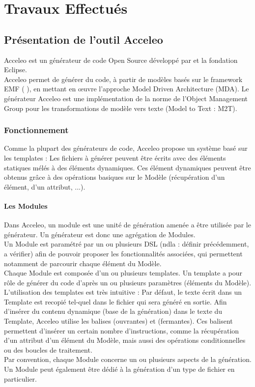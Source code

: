 \chapter{Travaux Effectués}\label{chap:tra}

\section{Présentation de l'outil Acceleo}

Acceleo est un générateur de code Open Source développé par \kwobeo{} et la fondation Eclipse.
\\
Acceleo permet de générer du code, à partir de modèles basés sur le framework EMF (\cf{} \cite{emf}), en mettant en œuvre l'approche Model Driven Architecture (MDA). Le générateur Acceleo est une implémentation de la norme de l'Object Management Group \cite{omg} pour les transformations de modèle vers texte (Model to Text : M2T).

\subsection{Fonctionnement}

Comme la plupart des générateurs de code, Acceleo propose un système basé sur les templates : Les fichiers à générer peuvent être écrits avec des éléments statiques mélés à des éléments dynamiques. Ces élément dynamiques peuvent être obtenus grâce à des opérations basiques sur le Modèle (récupération d'un élément, d'un attribut, ...).

\subsubsection{Les Modules}

Dans Acceleo, un module est une unité de génération amenée a être utilisée par le générateur. Un générateur est donc une agrégation de Modules.
\\
Un Module est paramétré par un ou plusieurs DSL (ndla : définir précédemment, a vérifier) afin de pouvoir proposer les fonctionnalités associées, qui permettent notamment de parcourir chaque élément du Modèle.
\\
Chaque Module est composée d'un ou plusieurs templates. Un template a pour rôle de générer du code d'après un ou plusieurs paramètres (éléments du Modèle). L'utilisation des templates est très intuitive : Par défaut, le texte écrit dans un Template est recopié tel-quel dans le fichier qui sera généré en sortie. Afin d'insérer du contenu dynamique (base de la génération) dans le texte du Template, Acceleo utilise les balises \guim{\textbf{[}} (ouvrantes) et \guim{\textbf{/]}} (fermantes). Ces balisent permettent d'insérer un certain nombre d'instructions, comme la récupération d'un attribut d'un élément du Modèle, mais aussi des opérations conditionnelles ou des boucles de traitement.
\\
Par convention, chaque Module concerne un ou plusieurs aspects de la génération. Un Module peut également être dédié à la génération d'un type de fichier en particulier.

